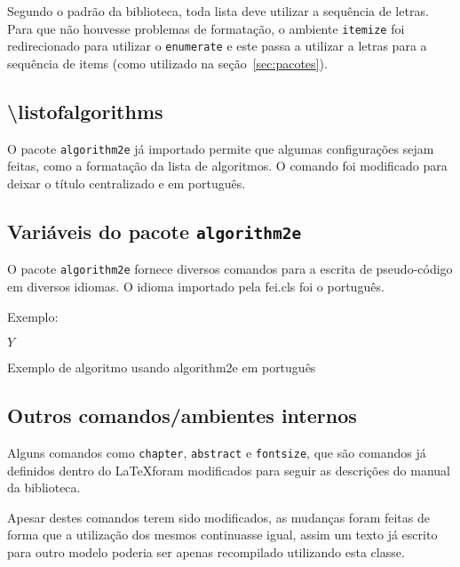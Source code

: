     Segundo o padrão da biblioteca, toda lista deve utilizar a sequência de letras. Para que não houvesse problemas de formatação, o ambiente \verb+itemize+ foi redirecionado para utilizar o \verb+enumerate+ e este passa a utilizar a letras para a sequência de items (como utilizado na seção~\ref{sec:pacotes}).
    
    \subsection{\textbackslash listofalgorithms}
    
    O pacote \verb+algorithm2e+ já importado permite que algumas configurações sejam feitas, como a formatação da lista de algoritmos. O comando foi modificado para deixar o título centralizado e em português.
    
    \subsection{Variáveis do pacote \texttt{algorithm2e}}
    
    O pacote \verb+algorithm2e+ fornece diversos comandos para a escrita de pseudo-código em diversos idiomas. O idioma importado pela fei.cls foi o português.
    
    Exemplo:
    
\begin{algorithm}


\Retorna \(Y\)

\caption{Exemplo de algoritmo usando algorithm2e em português}
\label{lst:alg}
\end{algorithm}
    
    \subsection{Outros comandos/ambientes internos}
    
    Alguns comandos como \verb+chapter+, \verb+abstract+ e \verb+fontsize+, que são comandos já definidos dentro do \LaTeX foram modificados para seguir as descrições do manual da biblioteca.

    Apesar destes comandos terem sido modificados, as mudanças foram feitas de forma que a utilização dos mesmos continuasse igual, assim um texto já escrito para outro modelo poderia ser apenas recompilado utilizando esta classe.

